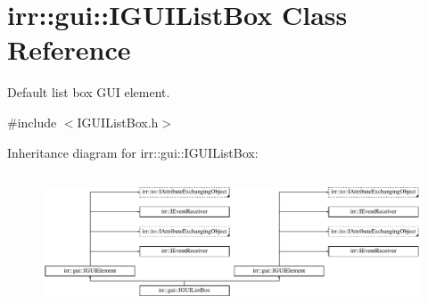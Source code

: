 \hypertarget{classirr_1_1gui_1_1IGUIListBox}{}\section{irr\+:\+:gui\+:\+:I\+G\+U\+I\+List\+Box Class Reference}
\label{classirr_1_1gui_1_1IGUIListBox}


Default list box G\+UI element.  




{\ttfamily \#include $<$I\+G\+U\+I\+List\+Box.\+h$>$}

Inheritance diagram for irr\+:\+:gui\+:\+:I\+G\+U\+I\+List\+Box\+:\begin{figure}[H]
\begin{center}
\leavevmode
\includegraphics[height=4.038462cm]{classirr_1_1gui_1_1IGUIListBox}
\end{center}
\end{figure}
